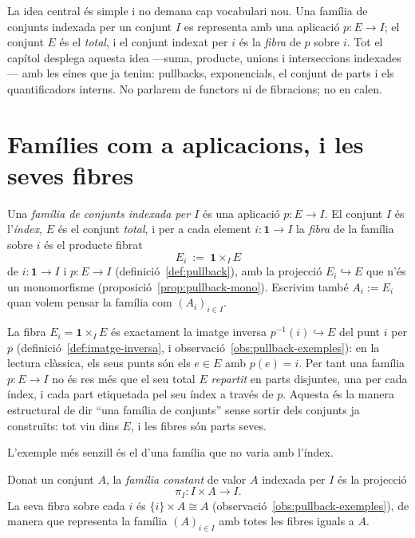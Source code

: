 La idea central és simple i no demana cap vocabulari nou. Una família de
conjunts indexada per un conjunt \(I\) es representa amb una aplicació
\(p\colon E\to I\); el conjunt \(E\) és el \emph{total}, i el conjunt indexat
per \(i\) és la \emph{fibra} de \(p\) sobre \(i\). Tot el capítol desplega
aquesta idea ---suma, producte, unions i interseccions indexades--- amb les
eines que ja tenim: pullbacks, exponencials, el conjunt de parts i els
quantificadors interns. No parlarem de functors ni de fibracions; no en
calen.

\section{Famílies com a aplicacions, i les seves fibres}\label{sec:families-aplicacions}

\begin{definicio}\label{def:familia}
Una \emph{família de conjunts indexada per \(I\)} és una aplicació
\(p\colon E\to I\). El conjunt \(I\) és l'\emph{índex}, \(E\) és el conjunt
\emph{total}, i per a cada element \(i\colon\mathbf1\to I\) la \emph{fibra}
de la família sobre \(i\) és el producte fibrat
\[
E_i\ :=\ \mathbf1\times_I E
\]
de \(i\colon\mathbf1\to I\) i \(p\colon E\to I\)
(definició~\ref{def:pullback}), amb la projecció
\(E_i\hookrightarrow E\) que n'és un monomorfisme
(proposició~\ref{prop:pullback-mono}). Escrivim també \(A_i:=E_i\) quan
volem pensar la família com \((A_i)_{i\in I}\).
\end{definicio}

\begin{observacio}\label{obs:fibra-part}
La fibra \(E_i=\mathbf1\times_I E\) és exactament la imatge inversa
\(p^{-1}(i)\hookrightarrow E\) del punt \(i\) per \(p\)
(definició~\ref{def:imatge-inversa}, i
observació~\ref{obs:pullback-exemples}): en la lectura clàssica, els seus
punts són els \(e\in E\) amb \(p(e)=i\). Per tant una família \(p\colon E\to
I\) no és res més que el seu total \(E\) \emph{repartit} en parts disjuntes,
una per cada índex, i cada part etiquetada pel seu índex a través de \(p\).
Aquesta és la manera estructural de dir \enquote{una família de conjunts}
sense sortir dels conjunts ja construïts: tot viu dins \(E\), i les fibres
són parts seves.
\end{observacio}

L'exemple més senzill és el d'una família que no varia amb l'índex.

\begin{definicio}\label{def:familia-constant}
Donat un conjunt \(A\), la \emph{família constant} de valor \(A\) indexada
per \(I\) és la projecció
\[
\pi_I\colon I\times A\longrightarrow I .
\]
La seva fibra sobre cada \(i\) és \(\{i\}\times A\cong A\)
(observació~\ref{obs:pullback-exemples}), de manera que representa la família
\((A)_{i\in I}\) amb totes les fibres iguals a \(A\).
\end{definicio}

